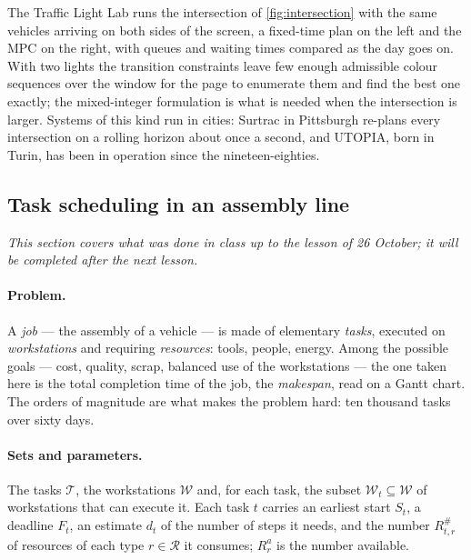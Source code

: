 \begin{labbox}
The Traffic Light Lab runs the intersection of \cref{fig:intersection} with the same vehicles
arriving on both sides of the screen, a fixed-time plan on the left and the MPC on the right,
with queues and waiting times compared as the day goes on. With two lights the transition
constraints leave few enough admissible colour sequences over the window for the page to
enumerate them and find the best one exactly; the mixed-integer formulation is what is needed
when the intersection is larger. Systems of this kind run in cities: Surtrac in Pittsburgh re-plans every intersection on
a rolling horizon about once a second, and UTOPIA, born in Turin, has been in operation since
the nineteen-eighties.
\end{labbox}

\subsection{Task scheduling in an assembly line}
\label{sec:scheduling}

\emph{This section covers what was done in class up to the lesson of 26 October; it will be
completed after the next lesson.}

\paragraph{Problem.} A \emph{job} --- the assembly of a vehicle --- is made of elementary
\emph{tasks}, executed on \emph{workstations} and requiring \emph{resources}: tools, people,
energy. Among the possible goals --- cost, quality, scrap, balanced use of the workstations ---
the one taken here is the total completion time of the job, the \emph{makespan}, read on a
Gantt chart. The orders of magnitude are what makes the problem hard: ten thousand tasks over
sixty days.

\paragraph{Sets and parameters.} The tasks $\mathcal{T}$, the workstations $\mathcal{W}$ and,
for each task, the subset $\mathcal{W}_t \subseteq \mathcal{W}$ of workstations that can execute
it. Each task $t$ carries an earliest start $S_t$, a deadline $F_t$, an estimate $d_t$ of the
number of steps it needs, and the number $R^{\#}_{t,r}$ of resources of each type $r \in
\mathcal{R}$ it consumes; $R^{a}_r$ is the number available.

